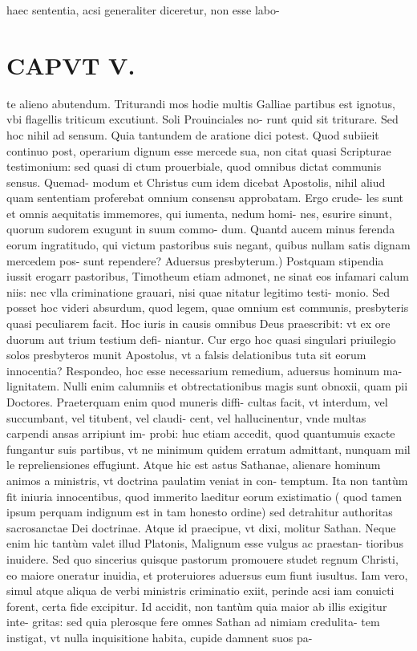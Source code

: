 \documentclass{article}
\begin{document}
\begin{pages}
haec sententia, acsi generaliter diceretur, non esse labo-  \pend
{}
{}
\subsection*{\textit{}}
\section*{CAPVT V. }
\marginpar{[ p.67 ]}\pstart te alieno abutendum. Triturandi mos hodie multis Galliae partibus est ignotus, vbi flagellis triticum excutiunt. Soli Prouinciales no- runt quid sit triturare. Sed hoc nihil ad sensum. Quia tantundem de aratione dici potest. Quod subiieit continuo post, operarium dignum esse mercede sua, non citat quasi Scripturae testimonium: sed quasi di ctum prouerbiale, quod omnibus dictat communis sensus. Quemad- modum et Christus cum idem dicebat Apostolis, nihil aliud quam sententiam proferebat omnium consensu approbatam. Ergo crude- les sunt et omnis aequitatis immemores, qui iumenta, nedum homi- nes, esurire sinunt, quorum sudorem exugunt in suum commo- dum. Quantd aucem minus ferenda eorum ingratitudo, qui victum pastoribus suis negant, quibus nullam satis dignam mercedem pos- sunt rependere?  \pend\pstart Aduersus presbyterum.) Postquam stipendia iussit erogarr pastoribus, Timotheum etiam admonet, ne sinat eos infamari calum niis: nec vlla criminatione grauari, nisi quae nitatur legitimo testi- monio. Sed posset hoc videri absurdum, quod legem, quae omnium est communis, presbyteris quasi peculiarem facit. Hoc iuris in causis omnibus Deus praescribit: vt ex ore duorum aut trium testium defi- niantur. Cur ergo hoc quasi singulari priuilegio solos presbyteros munit Apostolus, vt a falsis delationibus tuta sit eorum innocentia? Respondeo, hoc esse necessarium remedium, aduersus hominum ma- lignitatem. Nulli enim calumniis et obtrectationibus magis sunt obnoxii, quam pii Doctores. Praeterquam enim quod muneris diffi- cultas facit, vt interdum, vel succumbant, vel titubent, vel claudi- cent, vel hallucinentur, vnde multas carpendi ansas arripiunt im- probi: huc etiam accedit, quod quantumuis exacte fungantur suis partibus, vt ne minimum quidem erratum admittant, nunquam mil le repreliensiones effugiunt. Atque hic est astus Sathanae, alienare hominum animos a ministris, vt doctrina paulatim veniat in con- temptum. Ita non tantùm fit iniuria innocentibus, quod immerito laeditur eorum existimatio ( quod tamen ipsum perquam indignum est in tam honesto ordine) sed detrahitur authoritas sacrosanctae Dei doctrinae. Atque id praecipue, vt dixi, molitur Sathan. Neque enim hic tantùm valet illud Platonis, Malignum esse vulgus ac praestan- tioribus inuidere. Sed quo sincerius quisque pastorum promouere studet regnum Christi, eo maiore oneratur inuidia, et proteruiores aduersus eum fiunt iusultus. Iam vero, simul atque aliqua de verbi ministris criminatio exiit, perinde acsi iam conuicti forent, certa fide excipitur. Id accidit, non tantùm quia maior ab illis exigitur inte- gritas: sed quia plerosque fere omnes Sathan ad nimiam credulita- tem instigat, vt nulla inquisitione habita, cupide damnent suos pa-  \pend

\end{pages}
\end{document}
